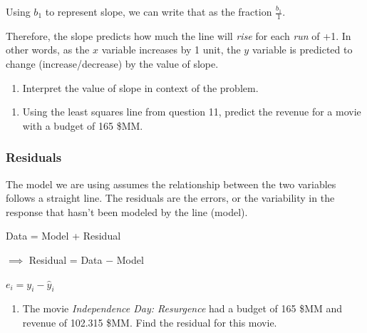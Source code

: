 \documentclass[
]{report}
\providecommand{\tightlist}{%
  \setlength{\itemsep}{0pt}\setlength{\parskip}{0pt}}
\begin{document}
Using \(b_1\) to represent slope, we can write that as the fraction \(\frac{b_1}{1}\).

Therefore, the slope predicts how much the line will \emph{rise} for each \emph{run} of +1. In other words, as the \(x\) variable increases by 1 unit, the \(y\) variable is predicted to change (increase/decrease) by the value of slope.

\begin{enumerate}
\def\labelenumi{\arabic{enumi}.}
\setcounter{enumi}{11}
\tightlist
\item
  Interpret the value of slope in context of the problem.
\end{enumerate}

\vspace{.8in}

\begin{enumerate}
\def\labelenumi{\arabic{enumi}.}
\setcounter{enumi}{12}
\tightlist
\item
  Using the least squares line from question 11, predict the revenue for a movie with a budget of 165 \$MM.
\end{enumerate}

\vspace{.6in}

\hypertarget{residuals}{%
\subsubsection*{Residuals}\label{residuals}}

The model we are using assumes the relationship between the two variables follows a straight line. The residuals are the errors, or the variability in the response that hasn't been modeled by the line (model).

\begin{center}
Data = Model + Residual

$\implies$ Residual = Data $-$ Model

$e_i=y_i-\hat{y}_i$
\end{center}

\begin{enumerate}
\def\labelenumi{\arabic{enumi}.}
\setcounter{enumi}{13}
\tightlist
\item
  The movie \emph{Independence Day: Resurgence} had a budget of 165 \$MM and revenue of 102.315 \$MM. Find the residual for this movie.
\end{enumerate}

\vspace{.8in}
\end{document}
